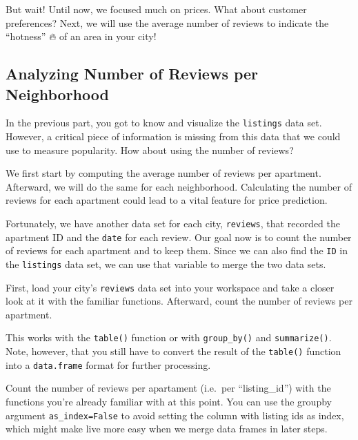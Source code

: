 \documentclass[
  11pt,
]{article}
\newenvironment{tips}[1]
  {
  \begin{itemize}
  \footnotesize
  \renewcommand{\labelitemi}{
    \raisebox{-.7\height}[0pt][0pt]{
      {\setkeys{Gin}{width=3em,keepaspectratio}
        \texttt{[image: images/\#1.png]}}
    }
  }
  \setlength{\fboxsep}{1em}
  \begin{rbox}
  \item
  }
  {
  \end{rbox}
  \end{itemize}
  }
\newenvironment{tipsp}[1]
  {
  \begin{itemize}
  \footnotesize
  \renewcommand{\labelitemi}{
    \raisebox{-.7\height}[0pt][0pt]{
      {\setkeys{Gin}{width=3em,keepaspectratio}
        \texttt{[image: images/\#1.png]}}
    }
  }
  \setlength{\fboxsep}{1em}
  \begin{pbox}
  \item
  }
  {
  \end{pbox}
  \end{itemize}
  }
\begin{document}
But wait!
Until now, we focused much on prices.
What about customer preferences?
Next, we will use the average number of reviews to indicate the ``hotness'' 🔥 of an area in your city!

\hypertarget{analyzing-number-of-reviews-per-neighborhood}{%
\subsection{Analyzing Number of Reviews per Neighborhood}\label{analyzing-number-of-reviews-per-neighborhood}}

In the previous part, you got to know and visualize the \texttt{listings} data set.
However, a critical piece of information is missing from this data that we could use to measure popularity.
How about using the number of reviews?

We first start by computing the average number of reviews per apartment.
Afterward, we will do the same for each neighborhood.
Calculating the number of reviews for each apartment could lead to a vital feature for price prediction.

Fortunately, we have another data set for each city, \texttt{reviews}, that recorded the apartment ID and the \texttt{date} for each review.
Our goal now is to count the number of reviews for each apartment and to keep them.
Since we can also find the \texttt{ID} in the \texttt{listings} data set, we can use that variable to merge the two data sets.

First, load your city's \texttt{reviews} data set into your workspace and take a closer look at it with the familiar functions.
Afterward, count the number of reviews per apartment.

\begin{tips}r
This works with the \texttt{table()} function or with \texttt{group\_by()} and \texttt{summarize()}.
Note, however, that you still have to convert the result of the \texttt{table()} function into a \texttt{data.frame} format for further processing.

\end{tips}

\begin{tipsp}p
Count the number of reviews per apartament (i.e.~per ``listing\_id'') with the functions you're already familiar with at this point.
You can use the groupby argument \texttt{as\_index=False} to avoid setting the column with listing ids as index, which might make live more easy when we merge data frames in later steps.

\end{tipsp}
\end{document}
